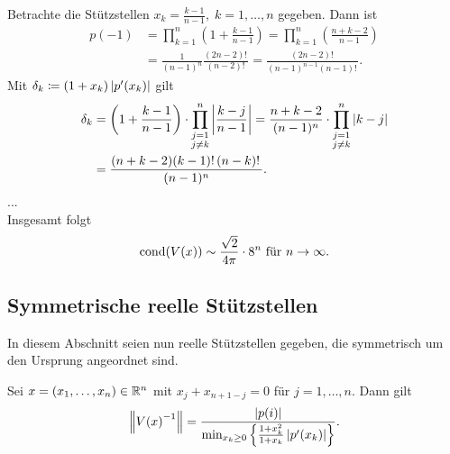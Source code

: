 \begin{example}
    Betrachte die Stützstellen $x_k = \frac{k-1}{n-1}, \; k=1, \dots, n$ gegeben.
    Dann ist
    \[
        \begin{split}
            p(-1)
            &= \prod_{k=1}^{n} \left( 1 + \frac{k-1}{n-1} \right)
            = \prod_{k=1}^{n} \left( \frac{n + k - 2}{n-1} \right)\\
            &= \frac{1}{(n-1)^n} \frac{(2n-2)!\,}{(n-2)!\,}
            = \frac{(2n-2)!\,}{(n-1)^{n-1}(n-1)!\,}.
        \end{split}
    \]
    Mit $\delta_k \coloneqq (1 + x_k) \left\lvert  p^{\prime}(x_k)  \right\rvert$ gilt
    \[
        \begin{split}
            \delta_k
            &= \left( 1 + \frac{k-1}{n-1} \right) \cdot \prod_{\substack{j=1\\ j\neq k}}^{n} \left\lvert  \frac{k-j}{n-1}  \right\rvert
            = \frac{n+k-2}{(n-1)^{n}} \cdot \prod_{\substack{j=1\\ j\neq k}}^{n} \left\lvert  k-j  \right\rvert\\
            &= \frac{(n+k-2)(k-1)!\, (n-k)!\,}{(n-1)^{n}} .
        \end{split}
    \]
    ...\\ %
    Insgesamt folgt
    \[
        \text{cond$(\text{$V(x)$})$} \sim \frac{\sqrt{2}}{4\pi} \cdot 8^n \text{ für } n \rightarrow \infty.
    \]
\end{example}

\subsection{Symmetrische reelle Stützstellen}
In diesem Abschnitt seien nun reelle Stützstellen gegeben, die symmetrisch um
den Ursprung angeordnet sind.

\begin{lemma}
    Sei $x = (x_1, \dots, x_n) \in \mathbb{R}^n$ mit $x_j + x_{n+1-j} = 0$ für $j = 1, \dots, n$.
    Dann gilt
    \[
        \left\lVert \text{$V(x)$}^{-1} \right\rVert = \frac{\left\lvert p(i) \right\rvert}{\min_{x_k \geq 0} \left\{ \frac{1 + x_k^2}{1 + x_k} \left\lvert p^{\prime}(x_k) \right\rvert \right\} }.
    \]
\end{lemma}
